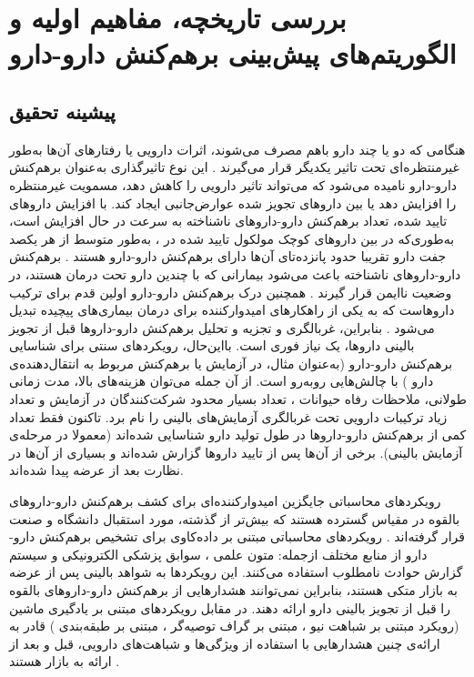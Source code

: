 \chapter{بررسی تاریخچه‌، مفاهیم اولیه و الگوریتم‌های پیش‌بینی برهم‌کنش دارو-دارو}



\section{پیشینه تحقیق}
\label{intro}
هنگامی که دو یا چند دارو باهم مصرف می‌شوند، اثرات دارویی یا رفتارهای آن‌ها به‌طور غیرمنتظره‌ای تحت تاثیر یکدیگر قرار می‌گیرند
\cite{Wienkers2005}. 
این نوع تاثیرگذاری به‌عنوان برهم‌کنش دارو-دارو نامیده می‌شود که می‌تواند تاثیر دارویی را کاهش دهد، مسمویت غیرمنتظره را افزایش دهد یا بین داروهای تجویز شده عوارض‌جانبی ایجاد کند. با افزایش داروهای تایید شده، تعداد برهم‌کنش‌ دارو-داروهای ناشناخته به سرعت در حال افزایش است، به‌طوری‌که در بین داروهای کوچک مولکول تایید شده در 
،
به‌طور متوسط از هر یکصد جفت دارو تقریبا حدود پانزده‌تای آن‌ها دارای برهم‌کنش دارو-دارو هستند
\cite{Law2014}. 
برهم‌کنش دارو-داروهای ناشناخته باعث می‌شود بیمارانی که با چندین دارو تحت درمان هستند، در وضعیت ناایمن قرار گیرند
\cite{Leape1995, Businaro2013,Karbownik2017,Mulroy2017}. 
همچنین درک برهم‌کنش دارو-دارو اولین قدم برای ترکیب داروهاست که به یکی از راهکارهای امیدوارکننده برای درمان بیماری‌های پیچیده تبدیل می‌شود
\cite{Zhao2011}. 
بنابراین، غربالگری و تجزیه‌ و‌ تحلیل برهم‌کنش دارو-داروها قبل از تجویز بالینی داروها، یک نیاز فوری است. با‌این‌حال، رویکردهای سنتی برای شناسایی برهم‌کنش دارو-دارو (به‌عنوان مثال، در آزمایش 
\cite{Veith2009} 
یا برهم‌کنش مربوط به انتقال‌دهنده‌ی دارو
\cite{Huang2007}) 
با چالش‌هایی روبه‌رو است. از آن جمله می‌توان هزینه‌های بالا، مدت زمانی طولانی، ملاحظات رفاه حیوانات
\cite{Zhang2015}، 
تعداد بسیار محدود شرکت‌کنندگان در آزمایش و تعداد زیاد ترکیبات دارویی تحت غربالگری آزمایش‌های بالینی را نام برد. تاکنون فقط تعداد کمی از برهم‌کنش دارو-داروها در طول تولید دارو شناسایی شده‌اند (معمولا در مرحله‌ی آزمایش بالینی). برخی از آن‌ها پس از تایید داروها گزارش شده‌اند و بسیاری از آن‌ها در نظارت بعد از عرضه پیدا شده‌اند.

رویکردهای محاسباتی جایگزین امیدوارکننده‌ای برای کشف برهم‌کنش دارو-داروهای بالقوه
در مقیاس گسترده هستند که بیش‌تر از گذشته، مورد استقبال دانشگاه و صنعت قرار گرفته‌اند
\cite{Wiśniowska2016, Zhou2016}.
رویکردهای محاسباتی مبتنی بر داده‌کاوی برای تشخیص برهم‌کنش دارو-دارو از منابع مختلف
\cite{Zhang2015}
از‌جمله: متون علمی
\cite{Bui2014, Zhang2016}،
سوابق پزشکی الکترونیکی
\cite{Duke2012}
و سیستم گزارش حوادث نامطلوب
استفاده می‌کنند. این رویکردها به شواهد بالینی پس از عرضه به بازار متکی هستند، بنابراین نمی‌توانند هشدارهایی از برهم‌کنش دارو-داروهای بالقوه را قبل از تجویز بالینی دارو ارائه دهند. در مقابل رویکردهای مبتنی بر یادگیری ماشین (رویکرد مبتنی بر شباهت نیو
\cite{Vilar2014}،
مبتنی بر گراف توصیه‌گر
\cite{Zhang2015}،
مبتنی بر طبقه‌بندی
\cite{Cheng2014})
قادر به ارائه‌ی چنین هشدارهایی با استفاده از ویژگی‌ها و شباهت‌های دارویی، قبل و بعد از ارائه به بازار هستند
\cite{Li2016}.

